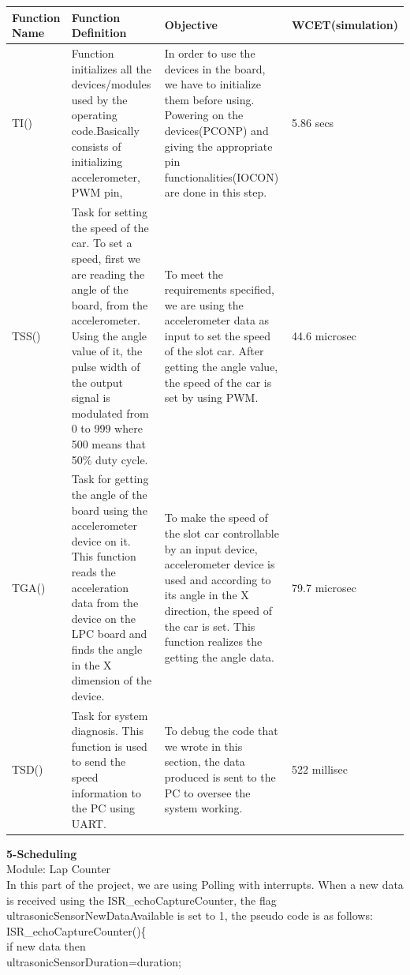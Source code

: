 \documentclass{article}
\begin{document}
\begin{tabular}{| C{4cm} | C{4cm} | C{4cm} | C{2cm} |}
\hline
\textbf{Function Name} &\textbf{Function Definition}  & \textbf{Objective} &\textbf{WCET}\linebreak(simulation)\\
\hline
TI()&Function initializes all the devices/modules used by the operating code.Basically consists of initializing
accelerometer, PWM pin, &In order to use the devices in the board, we have to initialize them before using.
Powering on the devices(PCONP) and giving the appropriate pin functionalities(IOCON) are done in this step.&5.86 secs\\
\hline
TSS()&Task for setting the speed of the car. To set a speed, first we are reading the angle of the board, from the
accelerometer. Using the angle value of it, the pulse width of the output signal is modulated from 0 to 999 where 500
means that 50\% duty cycle.& To meet the requirements specified, we are using the accelerometer data as input to
set the speed of the slot car. After getting the angle value, the speed of the car is set by using PWM.&44.6 microsec\\
\hline
TGA()&Task for getting the angle of the board using the accelerometer device on it. This function reads the
acceleration data from the device on the LPC board and finds the angle in the X dimension of the device.&
To make the speed of the slot car controllable by an input device, accelerometer device is used and according to
its angle in the X direction, the speed of the car is set. This function realizes the getting the angle data.&79.7 microsec\\
\hline
TSD()&Task for system diagnosis. This function is used to send the speed information to the PC using UART.&To debug the
code that we wrote in this section, the data produced is sent to the PC to oversee the system working.&522 millisec\\
\hline
\end{tabular}
\clearpage
{\huge\textbf {5-Scheduling}}
\\
{\huge {Module: Lap Counter}}
\\
In this part of the project, we are using Polling with interrupts. When a new data
is received using the ISR\_echoCaptureCounter, the flag ultrasonicSensorNewDataAvailable is
set to 1, the pseudo code is as follows:\\
ISR\_echoCaptureCounter()\{\\ if new data then\\ ultrasonicSensorDuration=duration;
\end{document}
